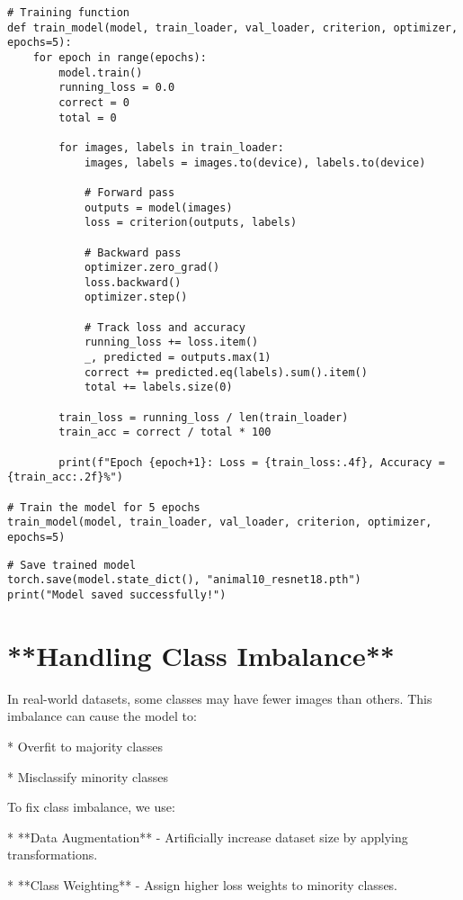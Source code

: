 \begin{verbatim}
# Training function
def train_model(model, train_loader, val_loader, criterion, optimizer, epochs=5):
    for epoch in range(epochs):
        model.train()
        running_loss = 0.0
        correct = 0
        total = 0

        for images, labels in train_loader:
            images, labels = images.to(device), labels.to(device)

            # Forward pass
            outputs = model(images)
            loss = criterion(outputs, labels)

            # Backward pass
            optimizer.zero_grad()
            loss.backward()
            optimizer.step()

            # Track loss and accuracy
            running_loss += loss.item()
            _, predicted = outputs.max(1)
            correct += predicted.eq(labels).sum().item()
            total += labels.size(0)

        train_loss = running_loss / len(train_loader)
        train_acc = correct / total * 100

        print(f"Epoch {epoch+1}: Loss = {train_loss:.4f}, Accuracy = {train_acc:.2f}%")

# Train the model for 5 epochs
train_model(model, train_loader, val_loader, criterion, optimizer, epochs=5)

\end{verbatim}

\begin{verbatim}
# Save trained model
torch.save(model.state_dict(), "animal10_resnet18.pth")
print("Model saved successfully!")
\end{verbatim}

\section{**Handling Class Imbalance**}

In real-world datasets, some classes may have fewer images than others. This imbalance can cause the model to:

*  Overfit to majority classes

*  Misclassify minority classes

To fix class imbalance, we use:

*  **Data Augmentation** - Artificially increase dataset size by applying transformations.

*  **Class Weighting** - Assign higher loss weights to minority classes.

